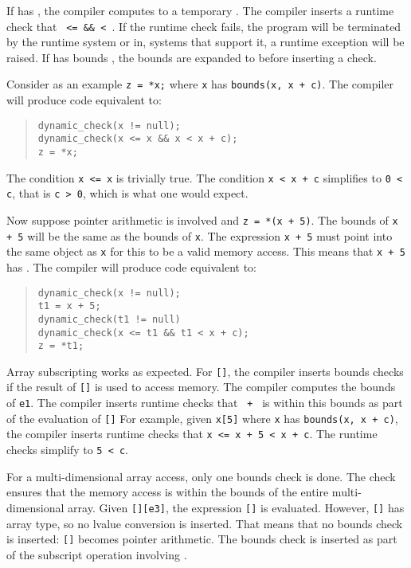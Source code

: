 If {} has {}, the compiler
computes  to a temporary .   The compiler inserts a runtime check that
\texttt{ <=  \&\&
 < }. If the runtime check fails, the program
will be terminated by the runtime system or in, systems that support it,
a runtime exception will be raised.   If {} has bounds {},
the bounds are expanded to  before inserting a check.

Consider as an example \verb|z = *x;| where 
\verb|x| has \verb|bounds(x, x + c)|. The compiler will produce code equivalent to:
\begin{quote}
\begin{verbatim}
dynamic_check(x != null);
dynamic_check(x <= x && x < x + c);
z = *x;
\end{verbatim}
\end{quote}
The condition \texttt{x <= x} is trivially true. The
condition \texttt{x < x + c} simplifies to \texttt{0
< c}, that is \texttt{c > 0}, which is what one
would expect.

Now suppose pointer arithmetic is involved and \texttt{z = *(x + 5)}. The
bounds of \texttt{x + 5} will be the same as the bounds of \texttt{x}.
The expression \texttt{x + 5} must point into the same object as
\texttt{x} for this to be a valid memory access. This means that
{\texttt{x + 5}} has {}.
The compiler will produce code equivalent to:

\begin{quote}
\begin{verbatim}
dynamic_check(x != null);
t1 = x + 5;
dynamic_check(t1 != null)
dynamic_check(x <= t1 && t1 < x + c);
z = *t1;
\end{verbatim}
\end{quote}

Array subscripting works as expected. For \texttt{[]}, the
compiler inserts bounds checks if the result of \texttt{[]}
is used to access memory.   The compiler computes the bounds of
\texttt{e1}. The compiler inserts
runtime checks that \texttt{ + } is within this bounds as
part of the evaluation of \texttt{[]} For example,
given \verb|x[5]| where \verb|x| has \verb|bounds(x, x + c)|, the
compiler inserts runtime checks that \verb|x <= x + 5 < x + c|. 
The runtime checks simplify to \verb|5 < c|.

For a multi-dimensional array access, only one bounds check is done.
The check ensures that the memory access is within the bounds of the entire multi-dimensional
array.  Given \texttt{[][e3]}, the expression \texttt{[]} is
evaluated.  However, \texttt{[]} has array type, so no lvalue
conversion is inserted. That means that no bounds check is inserted:
\texttt{[]} becomes pointer arithmetic.  The bounds check
is inserted as part of the subscript operation involving . 

